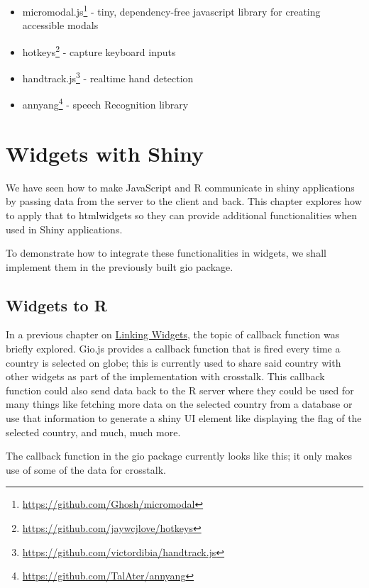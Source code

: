 \documentclass[
]{krantz}
\providecommand{\tightlist}{%
  \setlength{\itemsep}{0pt}\setlength{\parskip}{0pt}}
\renewcommand{\href}[2]{#2\footnote{\url{#1}}}
\begin{document}
\begin{itemize}
\tightlist
\item
  \href{https://github.com/Ghosh/micromodal}{micromodal.js} - tiny, dependency-free javascript library for creating accessible modals
\item
  \href{https://github.com/jaywcjlove/hotkeys}{hotkeys} - capture keyboard inputs
\item
  \href{https://github.com/victordibia/handtrack.js}{handtrack.js} - realtime hand detection
\item
  \href{https://github.com/TalAter/annyang}{annyang} - speech Recognition library
\end{itemize}

\hypertarget{shiny-widgets}{%
\chapter{Widgets with Shiny}\label{shiny-widgets}}

We have seen how to make JavaScript and R communicate in shiny applications by passing data from the server to the client and back. This chapter explores how to apply that to htmlwidgets so they can provide additional functionalities when used in Shiny applications.

To demonstrate how to integrate these functionalities in widgets, we shall implement them in the previously built gio package.

\hypertarget{shiny-widgets-to-r}{%
\section{Widgets to R}\label{shiny-widgets-to-r}}

In a previous chapter on \protect\hyperlink{linking-widgets}{Linking Widgets}, the topic of callback function was briefly explored. Gio.js provides a callback function that is fired every time a country is selected on globe; this is currently used to share said country with other widgets as part of the implementation with crosstalk. This callback function could also send data back to the R server where they could be used for many things like fetching more data on the selected country from a database or use that information to generate a shiny UI element like displaying the flag of the selected country, and much, much more.

The callback function in the gio package currently looks like this; it only makes use of some of the data for crosstalk.
\end{document}
